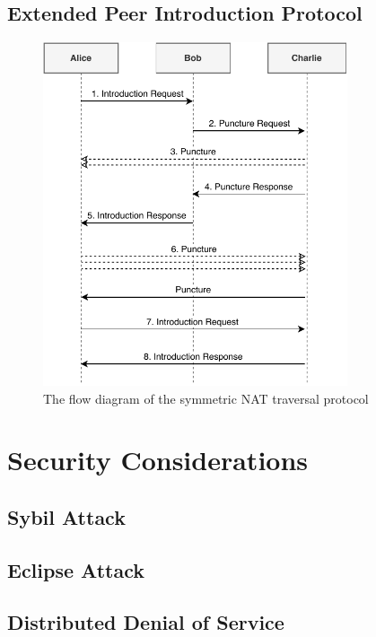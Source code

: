 \subsection{Extended Peer Introduction Protocol}

\begin{figure}[h!]
    \centering
    \includegraphics[width=0.8\textwidth]{diagrams/symmetric-nat-puncturing}
    \caption{The flow diagram of the symmetric NAT traversal protocol}
\end{figure}



\section{Security Considerations}

\subsection{Sybil Attack}
\subsection{Eclipse Attack}
\subsection{Distributed Denial of Service}
